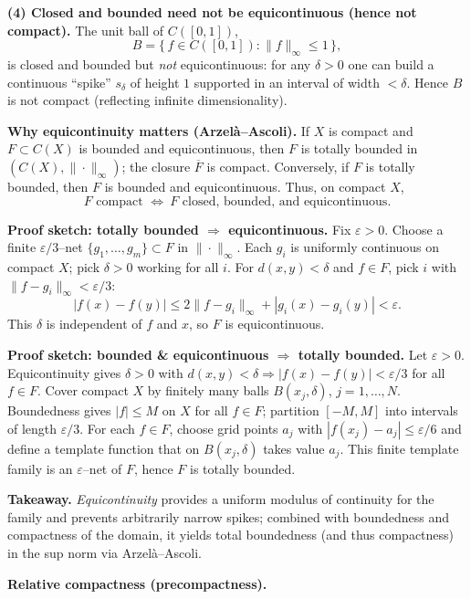 \documentclass[12pt,a4paper]{article}
\begin{document}
	\medskip
	\textbf{(4) Closed and bounded need not be equicontinuous (hence not compact).}
	The unit ball of $C([0,1])$,
	\[
	B=\{\,f\in C([0,1]): \|f\|_\infty\le 1\,\},
	\]
	is closed and bounded but \emph{not} equicontinuous: for any $\delta>0$ one can build a continuous
	``spike'' $s_\delta$ of height $1$ supported in an interval of width $<\delta$.
	Hence $B$ is not compact (reflecting infinite dimensionality).
	
	\medskip
	\textbf{Why equicontinuity matters (Arzel\`a--Ascoli).}
	If $X$ is compact and $F\subset C(X)$ is bounded and equicontinuous, then $F$ is totally bounded in
	$(C(X),\|\cdot\|_\infty)$; the closure $\overline F$ is compact. Conversely, if $F$ is totally bounded,
	then $F$ is bounded and equicontinuous. Thus, on compact $X$,
	\[
	\boxed{\text{$F$ compact } \Longleftrightarrow\ \text{$F$ closed, bounded, and equicontinuous}.}
	\]
	
	\medskip
	\textbf{Proof sketch: totally bounded $\Rightarrow$ equicontinuous.}
	Fix $\varepsilon>0$. Choose a finite $\varepsilon/3$--net $\{g_1,\dots,g_m\}\subset F$ in $\|\cdot\|_\infty$.
	Each $g_i$ is uniformly continuous on compact $X$; pick $\delta>0$ working for all $i$.
	For $d(x,y)<\delta$ and $f\in F$, pick $i$ with $\|f-g_i\|_\infty<\varepsilon/3$:
	\[
	|f(x)-f(y)|\le 2\|f-g_i\|_\infty+|g_i(x)-g_i(y)|<\varepsilon.
	\]
	This $\delta$ is independent of $f$ and $x$, so $F$ is equicontinuous.
	
	\medskip
	\textbf{Proof sketch: bounded \& equicontinuous $\Rightarrow$ totally bounded.}
	Let $\varepsilon>0$. Equicontinuity gives $\delta>0$ with
	$d(x,y)<\delta \Rightarrow |f(x)-f(y)|<\varepsilon/3$ for all $f\in F$.
	Cover compact $X$ by finitely many balls $B(x_j,\delta)$, $j=1,\dots,N$.
	Boundedness gives $|f|\le M$ on $X$ for all $f\in F$; partition $[-M,M]$ into intervals of length $\varepsilon/3$.
	For each $f\in F$, choose grid points $a_j$ with $|f(x_j)-a_j|\le \varepsilon/6$ and define a template function that on
	$B(x_j,\delta)$ takes value $a_j$. This finite template family is an $\varepsilon$--net of $F$, hence $F$ is totally bounded.
	
	\medskip
	\textbf{Takeaway.}
	\emph{Equicontinuity} provides a uniform modulus of continuity for the family and prevents arbitrarily
	narrow spikes; combined with boundedness and compactness of the domain, it yields total boundedness
	(and thus compactness) in the sup norm via Arzel\`a--Ascoli.
	
	\textbf{Relative compactness (precompactness).}
	
\end{document}
